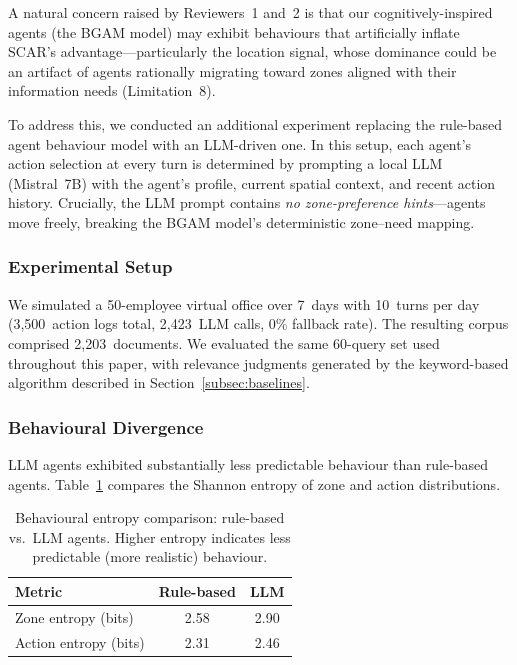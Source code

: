 \documentclass[journal]{IEEEtran}
\begin{document}
A natural concern raised by Reviewers~1 and~2 is that our cognitively-inspired agents (the BGAM model) may exhibit behaviours that artificially inflate SCAR's advantage---particularly the location signal, whose dominance could be an artifact of agents rationally migrating toward zones aligned with their information needs (Limitation~8).

To address this, we conducted an additional experiment replacing the rule-based agent behaviour model with an LLM-driven one. In this setup, each agent's action selection at every turn is determined by prompting a local LLM (Mistral~7B) with the agent's profile, current spatial context, and recent action history. Crucially, the LLM prompt contains \emph{no zone-preference hints}---agents move freely, breaking the BGAM model's deterministic zone--need mapping.

\subsubsection{Experimental Setup}

We simulated a 50-employee virtual office over 7~days with 10~turns per day (3{,}500~action logs total, 2{,}423~LLM calls, 0\% fallback rate). The resulting corpus comprised 2{,}203~documents. We evaluated the same 60-query set used throughout this paper, with relevance judgments generated by the keyword-based algorithm described in Section~\ref{subsec:baselines}.

\subsubsection{Behavioural Divergence}

LLM agents exhibited substantially less predictable behaviour than rule-based agents. Table~\ref{tab:llm_entropy} compares the Shannon entropy of zone and action distributions.

\begin{table}[htbp]
\centering
\caption{Behavioural entropy comparison: rule-based vs.\ LLM agents. Higher entropy indicates less predictable (more realistic) behaviour.}
\label{tab:llm_entropy}
\begin{tabular}{lcc}
\hline
\textbf{Metric} & \textbf{Rule-based} & \textbf{LLM} \\
\hline
Zone entropy (bits)   & 2.58 & 2.90 \\
Action entropy (bits) & 2.31 & 2.46 \\
\hline
\end{tabular}
\end{table}
\end{document}
